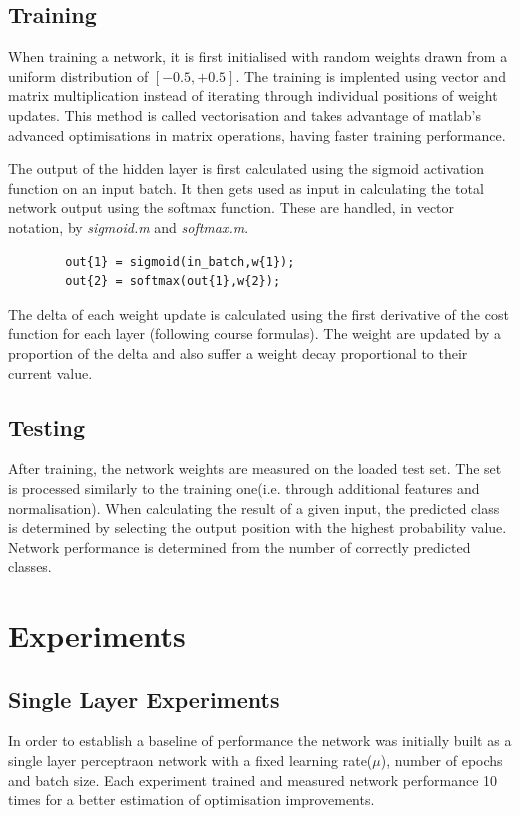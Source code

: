 \documentclass[11]{article}
\begin{document}
\subsection{Training}

When training a network, it is first initialised with random weights drawn from a uniform distribution of $[-0.5,+0.5]$. The training is implented using vector and matrix multiplication instead of iterating through individual positions of weight updates. This method is called vectorisation and takes advantage of matlab's advanced optimisations in matrix operations, having faster training performance.

The output of the hidden layer is first calculated using the sigmoid activation function on an input batch. It then gets used as input in calculating the total network output using the softmax function. These are handled, in vector notation, by \emph{sigmoid.m} and \emph{softmax.m}.
\begin{lstlisting}
        out{1} = sigmoid(in_batch,w{1});
        out{2} = softmax(out{1},w{2});
\end{lstlisting}

The delta of each weight update is calculated using the first derivative of the cost function for each layer (following course formulas). The weight are updated by a proportion of the delta and also suffer a weight decay proportional to their current value. 

\subsection{Testing}

After training, the network weights are measured on the loaded test set. The set is processed similarly to the training one(i.e. through additional features and normalisation). When calculating the result of a given input, the predicted class is determined by selecting the output position with the highest probability value. Network performance is determined from the number of correctly predicted classes. 

\section{Experiments}

\subsection{Single Layer Experiments}
In order to establish a baseline of performance the network was initially built as a single layer perceptraon network with a fixed learning rate($\mu$), number of epochs and batch size. Each experiment trained and measured network performance 10 times for a better estimation of optimisation improvements. 
\end{document}
